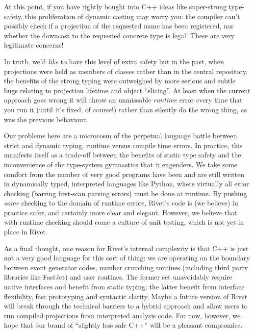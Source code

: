 \documentclass{JHEP3}
\begin{document}
\begin{philosophy}
  At this point, if you have rightly bought into C++ ideas like super-strong
  type-safety, this proliferation of dynamic casting may worry you: the compiler
  can't possibly check if a projection of the requested name has been
  registered, nor whether the downcast to the requested concrete type is
  legal. These are very legitimate concerns!

  In truth, we'd \emph{like} to have this level of extra safety but in the past,
  when projections were held as members of  classes
  rather than in the central  repository, the benefits
  of the strong typing were outweighed by more serious and subtle bugs relating
  to projection lifetime and object ``slicing''. At least when the current
  approach goes wrong it will throw an unmissable \emph{runtime} error every
  time that you run it (until it's fixed, of course!) rather than silently do
  the wrong thing, as was the previous behaviour.

  Our problems here are a microcosm of the perpetual language battle between
  strict and dynamic typing, runtime versus compile time errors. In practice,
  this manifests itself as a trade-off between the benefits of static type
  safety and the inconvenience of the type-system gymnastics that it engenders.
  We take some comfort from the number of very good programs have been and are
  still written in dynamically typed, interpreted languages like Python, where
  virtually all error checking (barring first-scan parsing errors) must be done
  at runtime. By pushing \emph{some} checking to the domain of runtime errors,
  Rivet's code is (we believe) in practice safer, and certainly more clear and
  elegant. However, we believe that with runtime checking should come a culture
  of unit testing, which is not yet in place in Rivet.

  As a final thought, one reason for Rivet's internal complexity is that C++ is
  just not a very good language for this sort of thing: we are operating on the
  boundary between event generator codes, number crunching routines (including
  third party libraries like FastJet) and user routines. The former set
  unavoidably require native interfaces and benefit from static typing; the
  latter benefit from interface flexibility, fast prototyping and syntactic
  clarity. Maybe a future version of Rivet will break through the technical
  barriers to a hybrid approach and allow users to run compiled projections from
  interpreted analysis code. For now, however, we hope that our brand of
  ``slightly less safe C++'' will be a pleasant compromise.
\end{philosophy}
\end{document}
